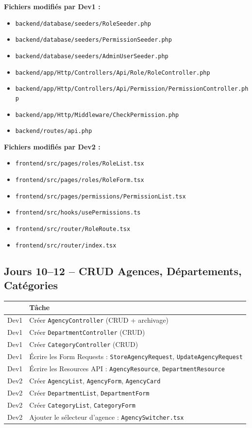\documentclass[12pt,a4paper]{report}
\begin{document}
\textbf{Fichiers modifiés par Dev1 :}
\begin{itemize}
    \item \texttt{backend/database/seeders/RoleSeeder.php}
    \item \texttt{backend/database/seeders/PermissionSeeder.php}
    \item \texttt{backend/database/seeders/AdminUserSeeder.php}
    \item \texttt{backend/app/Http/Controllers/Api/Role/RoleController.php}
    \item \texttt{backend/app/Http/Controllers/Api/Permission/PermissionController.php}
    \item \texttt{backend/app/Http/Middleware/CheckPermission.php}
    \item \texttt{backend/routes/api.php}
\end{itemize}

\textbf{Fichiers modifiés par Dev2 :}
\begin{itemize}
    \item \texttt{frontend/src/pages/roles/RoleList.tsx}
    \item \texttt{frontend/src/pages/roles/RoleForm.tsx}
    \item \texttt{frontend/src/pages/permissions/PermissionList.tsx}
    \item \texttt{frontend/src/hooks/usePermissions.ts}
    \item \texttt{frontend/src/router/RoleRoute.tsx}
    \item \texttt{frontend/src/router/index.tsx}
\end{itemize}

\subsection*{Jours 10--12 -- CRUD Agences, Départements, Catégories}

\begin{tabularx}{\textwidth}{l X}
    \toprule
    & \textbf{Tâche} \\
    \midrule
    Dev1 & Créer \texttt{AgencyController} (CRUD + archivage) \\
    Dev1 & Créer \texttt{DepartmentController} (CRUD) \\
    Dev1 & Créer \texttt{CategoryController} (CRUD) \\
    Dev1 & Écrire les Form Requests : \texttt{StoreAgencyRequest}, \texttt{UpdateAgencyRequest} \\
    Dev1 & Écrire les Resources API : \texttt{AgencyResource}, \texttt{DepartmentResource} \\
    Dev2 & Créer \texttt{AgencyList}, \texttt{AgencyForm}, \texttt{AgencyCard} \\
    Dev2 & Créer \texttt{DepartmentList}, \texttt{DepartmentForm} \\
    Dev2 & Créer \texttt{CategoryList}, \texttt{CategoryForm} \\
    Dev2 & Ajouter le sélecteur d'agence : \texttt{AgencySwitcher.tsx} \\
    \bottomrule
\end{tabularx}
\end{document}
